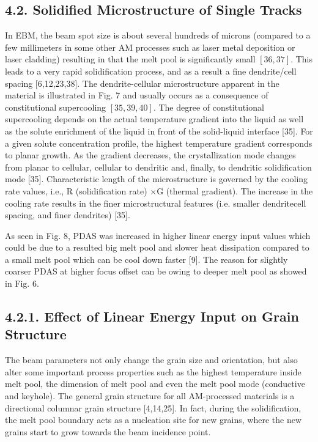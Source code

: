 \documentclass[10pt]{article}
\begin{document}
\subsection*{4.2. Solidified Microstructure of Single Tracks}
In EBM, the beam spot size is about several hundreds of microns (compared to a few millimeters in some other AM processes such as laser metal deposition or laser cladding) resulting in that the melt pool is significantly small $[36,37]$. This leads to a very rapid solidification process, and as a result a fine dendrite/cell spacing [6,12,23,38]. The dendrite-cellular microstructure apparent in the material is illustrated in Fig. 7 and usually occurs as a consequence of constitutional supercooling $[35,39,40]$. The degree of constitutional supercooling depends on the actual temperature gradient into the liquid as well as the solute enrichment of the liquid in front of the solid-liquid interface [35]. For a given solute concentration profile, the highest temperature gradient corresponds to planar growth. As the gradient decreases, the crystallization mode changes from planar to cellular, cellular to dendritic and, finally, to dendritic solidification mode [35]. Characteristic length of the microstructure is governed by the cooling rate values, i.e., $\mathrm{R}$ (solidification rate) $\times \mathrm{G}$ (thermal gradient). The increase in the cooling rate results in the finer microstructural features (i.e. smaller dendritecell spacing, and finer dendrites) [35].

As seen in Fig. 8, PDAS was increased in higher linear energy input values which could be due to a resulted big melt pool and slower heat dissipation compared to a small melt pool which can be cool down faster [9]. The reason for slightly coarser PDAS at higher focus offset can be owing to deeper melt pool as showed in Fig. 6.

\subsection*{4.2.1. Effect of Linear Energy Input on Grain Structure}
The beam parameters not only change the grain size and orientation, but also alter some important process properties such as the highest temperature inside melt pool, the dimension of melt pool and even the melt pool mode (conductive and keyhole). The general grain structure for all AM-processed materials is a directional columnar grain structure [4,14,25]. In fact, during the solidification, the melt pool boundary acts as a nucleation site for new grains, where the new grains start to grow towards the beam incidence point.
\end{document}
